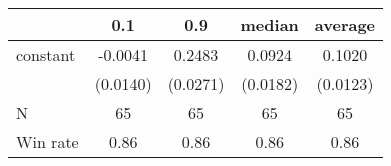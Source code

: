 \begin{tabular}{lcccc}
\hline
         &   0.1    &   0.9    &  median  & average   \\
\midrule
\midrule
constant & -0.0041  & 0.2483   & 0.0924   & 0.1020    \\
         & (0.0140) & (0.0271) & (0.0182) & (0.0123)  \\
N        & 65       & 65       & 65       & 65        \\
Win rate & 0.86     & 0.86     & 0.86     & 0.86      \\
\hline
\end{tabular}